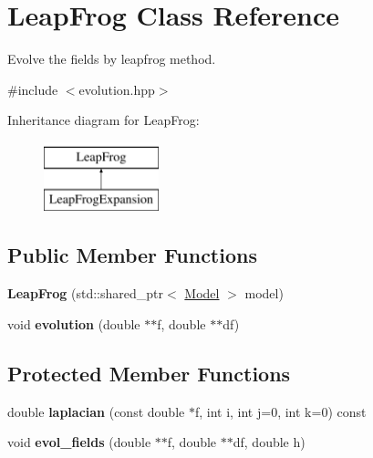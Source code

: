 \hypertarget{class_leap_frog}{}\section{Leap\+Frog Class Reference}
\label{class_leap_frog}


Evolve the fields by leapfrog method.  




{\ttfamily \#include $<$evolution.\+hpp$>$}

Inheritance diagram for Leap\+Frog\+:\begin{figure}[H]
\begin{center}
\leavevmode
\includegraphics[height=2.000000cm]{class_leap_frog}
\end{center}
\end{figure}
\subsection*{Public Member Functions}
\begin{DoxyCompactItemize}
\item 
\mbox{\label{class_leap_frog_a33b123fe88e71783cecdd1b9d0072c3f}} 
{\bfseries Leap\+Frog} (std\+::shared\+\_\+ptr$<$ \mbox{\hyperlink{class_model}{Model}} $>$ model)
\item 
\mbox{\label{class_leap_frog_a8a7b7814a7e1953c1c0a08ddfe3e49db}} 
void {\bfseries evolution} (double $\ast$$\ast$f, double $\ast$$\ast$df)
\end{DoxyCompactItemize}
\subsection*{Protected Member Functions}
\begin{DoxyCompactItemize}
\item 
\mbox{\label{class_leap_frog_a41ad24a048bec43cad6a531ff37fc926}} 
double {\bfseries laplacian} (const double $\ast$f, int i, int j=0, int k=0) const
\item 
\mbox{\label{class_leap_frog_adaa36c4c3fec6517cb99c5698b716ddb}} 
void {\bfseries evol\+\_\+fields} (double $\ast$$\ast$f, double $\ast$$\ast$df, double h)
\end{DoxyCompactItemize}
